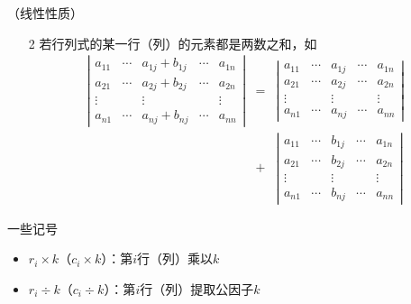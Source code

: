 \begin{frame}
  \begin{block}{（线性性质） }
    \begin{itemize}      
    \item[2] 若行列式的某一行（列）的元素都是两数之和，如
      \begin{equation}\label{xz3-2}
        \begin{array}{rcl}
          \left|
          \begin{array}{ccccc}
            a_{11} & \cdots & a_{1j}+b_{1j} & \cdots & a_{1n} \\
            a_{21} & \cdots & a_{2j}+b_{2j} & \cdots & a_{2n} \\
            \vdots&        & \vdots      &        & \vdots \\
            a_{n1} & \cdots & a_{nj}+b_{nj} & \cdots & a_{nn}
          \end{array}
          \right| & = & \left|
          \begin{array}{ccccc}
            a_{11} & \cdots & a_{1j} & \cdots & a_{1n} \\
            a_{21} & \cdots & a_{2j} & \cdots & a_{2n} \\
            \vdots&        & \vdots      &        & \vdots \\
            a_{n1} & \cdots & a_{nj} & \cdots & a_{nn}
          \end{array}
          \right| \\[0.4in]
          &+&
          \left|
          \begin{array}{ccccc}
            a_{11} & \cdots & b_{1j} & \cdots & a_{1n} \\
            a_{21} & \cdots & b_{2j} & \cdots & a_{2n} \\
            \vdots&        & \vdots      &        & \vdots \\
            a_{n1} & \cdots & b_{nj} & \cdots & a_{nn}
          \end{array}
          \right|
          
        \end{array}
      \end{equation}
    \end{itemize}
  \end{block}
\end{frame}


\begin{frame}
  \begin{block}{一些记号}
    \begin{itemize}
    \item $r_i\times k$（$c_i\times k$）：第$i$行（列）乘以$k$ \\[0.1in]
    \item $r_i\div k$（$c_i\div k$）：第$i$行（列）提取公因子$k$
    \end{itemize}
  \end{block}
\end{frame}

